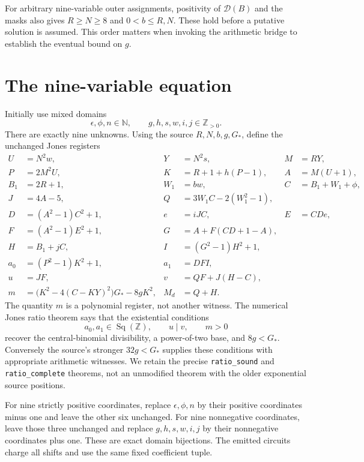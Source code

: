 \documentclass[11pt]{article}
\newcommand{\N}{\mathbb N}
\newcommand{\Z}{\mathbb Z}
\newcommand{\Pos}{\mathbb Z_{>0}}
\newcommand{\Sq}{\operatorname{Sq}}
\theoremstyle{definition}\newtheorem{definition}[theorem]{Definition}
\theoremstyle{remark}\newtheorem{remark}[theorem]{Remark}
\begin{document}
For arbitrary nine-variable outer assignments, positivity of $\mathcal D(B)$
and the masks also gives $R\ge N\ge8$ and $0<b\le R,N$. These hold
before a putative solution is assumed. This order matters when invoking
the arithmetic bridge to establish the eventual bound on $g$.

\section{The nine-variable equation}
\label{sec:nine}
Initially use mixed domains
\[
 \epsilon,\phi,n\in\N,\qquad g,h,s,w,i,j\in\Pos.
\]
There are exactly nine unknowns. Using the source $R,N,b,g,G_*$, define
the unchanged Jones registers
\begin{align*}
 U&=N^2w, &Y&=N^2s, &M&=RY,\\
 P&=2M^2U, &K&=R+1+h(P-1), &A&=M(U+1),\\
 B_1&=2R+1, &W_1&=bw, &C&=B_1+W_1+\phi,\\
 J&=4A-5, &Q&=3W_1C-2(W_1^2-1),\\
 D&=(A^2-1)C^2+1, &e&=iJC, &E&=CDe,\\
 F&=(A^2-1)E^2+1, &G&=A+F(CD+1-A),\\
 H&=B_1+jC, &I&=(G^2-1)H^2+1,\\
 a_0&=(P^2-1)K^2+1, &a_1&=DFI,\\
 u&=JF, &v&=QF+J(H-C),\\
 m&=\bigl(K^2-4(C-KY)^2\bigr)G_*-8gK^2,
 &M_d&=Q+H.
\end{align*}
The quantity $m$ is a polynomial register, not another witness.
The numerical Jones ratio theorem says that the existential conditions
\begin{equation}\label{eq:ratio_conditions}
 a_0,a_1\in\Sq(\Z),\qquad u\mid v,\qquad m>0
\end{equation}
recover the central-binomial divisibility, a power-of-two base, and
$8g<G_*$. Conversely the source's stronger $32g<G_*$ supplies these
conditions with appropriate arithmetic witnesses. We retain the precise
\texttt{ratio\_sound} and \texttt{ratio\_complete} theorems, not an
unmodified theorem with the older exponential source positions.



For nine strictly positive coordinates, replace $\epsilon,\phi,n$ by
their positive coordinates minus one and leave the other six unchanged.
For nine nonnegative coordinates, leave those three unchanged and replace
$g,h,s,w,i,j$ by their nonnegative coordinates plus one. These are exact
domain bijections. The emitted circuits charge all shifts and use the
same fixed coefficient tuple.
\end{document}

